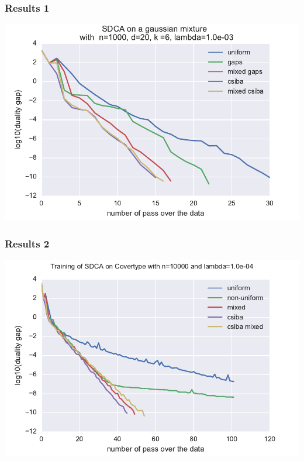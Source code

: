 \documentclass{beamer}
\DeclareMathOperator{\1}{\mathbb{1}}
\begin{document}
\begin{frame}
	\frametitle{Results 1}
	\includegraphics[width=\textwidth]{images/20170914_061831_gaussians_perf}
\end{frame}
\begin{frame}
	\frametitle{Results 2}
	\includegraphics[width=\textwidth]{images/20170914_065817_covertype_perf}
\end{frame}
\end{document}
